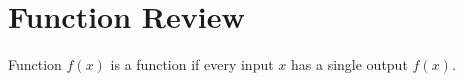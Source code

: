 \section{Function Review}

\begin{defn}{Function}
  $f(x)$ is a function if every input $x$ has a single output $f(x)$.
\end{defn}
